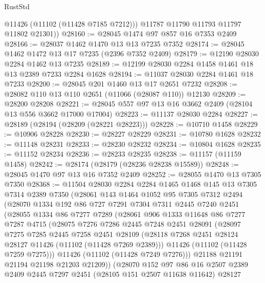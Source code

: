 \begin{lexlean}{RustStd}
\begin{coremodule}
          @11426
          (@11102 (@11428 @7185 @7212)))
        @11787
        @11790
        @11793
        @11797
        @11802
        @21301))
@28160 := @28045 @1474 @97 @857 @16 @7353 @2409
@28166 := @28037 @1462 @1470 @13 @13 @7235 @7352
@28174 := @28045 @1462 @1472 @13 @17 @7235 (@2396 @7352 @2409)
@28179 := @12190 @28030 @2284 @1462 @13 @7235
@28189 := @12199 @28030 @2284 @1458 @1461 @18 @13 @2389 @7233 @2284 @1628
@28194 := @11037 @28030 @2284 @1461 @18 @7233
@28200 := @28045 @201 @1460 @13 @17 @2651 @7232
@28208 := @28082 @110 @13 @110 @2651 (@11066 (@28087 @110)) @12130
@28209 := @28200 @28208
@28221 := @28045 @557 @97 @13 @16 @3662 @2409 (@28104 @13 @556 @3662 @17000 @17004)
@28223 := @11137 @28030 @2284
@28227 := @28189 (@28194 (@28209 (@28221 @28223)))
@28228 := @10710 @1458
@28229 := @10906 @28228
@28230 := @28227 @28229
@28231 := @10780 @1628
@28232 := @11148 @28231
@28233 := @28230 @28232
@28234 := @10804 @1628
@28235 := @11152 @28234
@28236 := @28233 @28235
@28238 := @11157 (@11159 @1458)
@28242 := @28174 (@28179 (@28236 @28238 @15589))
@28248 := @28045 @1470 @97 @13 @16 @7352 @2409
@28252 := @28055 @1470 @13 @7305 @7350
@28368 := @11504
    @28030
    @2284
    @2284
    @1465
    @1468
    @145
    @13
    @7305
    @7314
    @2389
    @7350
    (@28061
      @143
      @1464
      @1052
      @95
      @7305
      @7312
      @2494
      (@28070
        @1334
        @192
        @86
        @727
        @7291
        @7304
        @7311
        @2445
        @7240
        @2451
        (@28055
          @1334
          @86
          @7277
          @7289
          (@28061
            @906
            @1333
            @11648
            @86
            @7277
            @7287
            @4715
            (@28075
              @7276
              @7286
              @2445
              @7248
              @2451
              @28091
              (@28097
                @7275
                @7285
                @2445
                @7258
                @2451
                @28109
                (@28118 @7268 @2451 @28124 @28127 @11426 (@11102 (@11428 @7269 @2389)))
                @11426
                (@11102 (@11428 @7259 @7275)))
              @11426
              (@11102 (@11428 @7249 @7276)))
            @21188
            @21191
            @21194
            @21198
            @21203
            @21209))
        (@28070
          @152
          @97
          @86
          @16
          @2507
          @2389
          @2409
          @2445
          @7297
          @2451
          (@28105 @151 @2507 @11638 @11642)
          @28127

\end{coremodule}
\end{lexlean}
